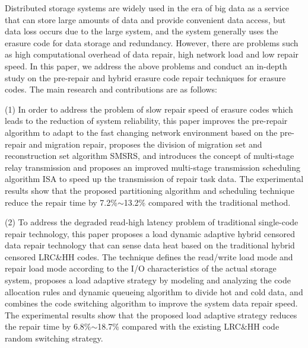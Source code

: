 
\begin{eabstract}
	Distributed storage systems are widely used in the era of big data as a service that can store 
	large amounts of data and provide convenient data access, but data loss occurs due to the large system, 
	and the system generally uses the erasure code for data storage and redundancy. However, 
	there are problems such as high computational overhead of data repair, high network load and low repair speed. 
	In this paper, we address the above problems and conduct an in-depth study on the pre-repair and hybrid erasure code repair techniques for erasure codes.
	The main research and contributions are as follows:

	(1) In order to address the problem of slow repair speed of erasure codes which leads to the reduction of system reliability, 
	this paper improves the pre-repair algorithm to adapt to the fast changing network environment based on the pre-repair and migration 
	repair, proposes the division of migration set and reconstruction set algorithm SMSRS, and introduces the concept of multi-stage 
	relay transmission and proposes an improved multi-stage transmission scheduling algorithm ISA to speed up the transmission of 
	repair task data. The experimental results show that the proposed partitioning algorithm and scheduling technique reduce the repair time by 
	7.2\%$\sim$13.2\% compared with the traditional method.

	(2) To address the degraded read-high latency problem of traditional single-code repair technology, 
	this paper proposes a load dynamic adaptive hybrid censored data repair technology that can 
	sense data heat based on the traditional hybrid censored LRC\&HH codes. The technique defines 
	the read/write load mode and repair load mode according to the I/O characteristics of the 
	actual storage system, proposes a load adaptive strategy by modeling and analyzing the code 
	allocation rules and dynamic queueing algorithm to divide hot and cold data, and combines the 
	code switching algorithm to improve the system data repair speed. The experimental results show 
	that the proposed load adaptive strategy reduces the repair time by 6.8\%$\sim$18.7\% compared with the existing LRC\&HH code random switching strategy.


\end{eabstract}
